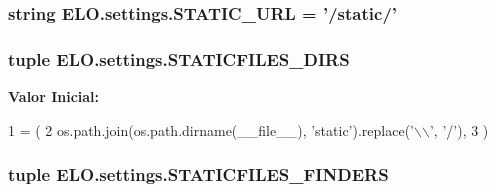 \hypertarget{namespaceELO_1_1settings_a408323f388e22737eedf90471a3809a4}{
\subsubsection[{S\-T\-A\-T\-I\-C\-\_\-\-U\-R\-L}]{\setlength{\rightskip}{0pt plus 5cm}string E\-L\-O.\-settings.\-S\-T\-A\-T\-I\-C\-\_\-\-U\-R\-L = '/static/'}}\label{df/d5b/namespaceELO_1_1settings_a408323f388e22737eedf90471a3809a4}
\hypertarget{namespaceELO_1_1settings_aa2272e7a822b45c2101e4f5a958e22a6}{
\subsubsection[{S\-T\-A\-T\-I\-C\-F\-I\-L\-E\-S\-\_\-\-D\-I\-R\-S}]{\setlength{\rightskip}{0pt plus 5cm}tuple E\-L\-O.\-settings.\-S\-T\-A\-T\-I\-C\-F\-I\-L\-E\-S\-\_\-\-D\-I\-R\-S}}\label{df/d5b/namespaceELO_1_1settings_aa2272e7a822b45c2101e4f5a958e22a6}
{\bfseries Valor Inicial\-:}
\begin{DoxyCode}
1 = (
2     os.path.join(os.path.dirname(\_\_file\_\_), \textcolor{stringliteral}{'static'}).replace(\textcolor{stringliteral}{'\(\backslash\)\(\backslash\)'}, \textcolor{stringliteral}{'/'}),
3 )
\end{DoxyCode}
\hypertarget{namespaceELO_1_1settings_a3e4decd51fab7bd5bdbdb12aac13b70a}{
\subsubsection[{S\-T\-A\-T\-I\-C\-F\-I\-L\-E\-S\-\_\-\-F\-I\-N\-D\-E\-R\-S}]{\setlength{\rightskip}{0pt plus 5cm}tuple E\-L\-O.\-settings.\-S\-T\-A\-T\-I\-C\-F\-I\-L\-E\-S\-\_\-\-F\-I\-N\-D\-E\-R\-S}}\label{df/d5b/namespaceELO_1_1settings_a3e4decd51fab7bd5bdbdb12aac13b70a}

